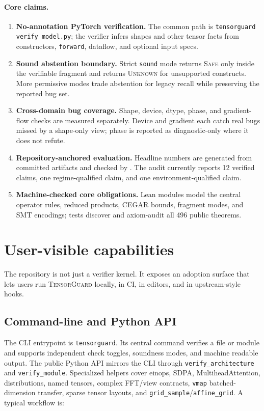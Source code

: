 \documentclass[11pt]{article}
\newcommand{\tg}{\textsc{TensorGuard}}
\newcommand{\safe}{\textsc{Safe}}
\newcommand{\unknown}{\textsc{Unknown}}
\begin{document}
\paragraph{Core claims.}
\begin{enumerate}[leftmargin=2em]
  \item \textbf{No-annotation PyTorch verification.}  The common path is
  \texttt{tensorguard verify model.py}; the verifier infers shapes and other
  tensor facts from constructors, \texttt{forward}, dataflow, and optional input
  specs.
  \item \textbf{Sound abstention boundary.}  Strict \texttt{sound} mode returns
  \safe{} only inside the verifiable fragment and returns \unknown{} for
  unsupported constructs.  More permissive modes trade abstention for legacy
  recall while preserving the reported bug set.
  \item \textbf{Cross-domain bug coverage.}  Shape, device, dtype, phase, and
  gradient-flow checks are measured separately.  Device and gradient each catch
  real bugs missed by a shape-only view; phase is reported as diagnostic-only
  where it does not refute.
  \item \textbf{Repository-anchored evaluation.}  Headline numbers are generated
  from committed artifacts and checked by .
  The audit currently reports 12 verified claims, one regime-qualified claim,
  and one environment-qualified claim.
  \item \textbf{Machine-checked core obligations.}  Lean modules model the
  central operator rules, reduced products, CEGAR bounds, fragment modes, and
  SMT encodings; tests discover and axiom-audit all 496 public theorems.
\end{enumerate}

\section{User-visible capabilities}

The repository is not just a verifier kernel.  It exposes an adoption surface
that lets users run \tg{} locally, in CI, in editors, and in upstream-style
hooks.

\subsection{Command-line and Python API}

The CLI entrypoint is \texttt{tensorguard}.  Its central command verifies a file
or module and supports independent check toggles, soundness modes, and machine
readable output.  The public Python API mirrors the CLI through
\texttt{verify\_architecture} and \texttt{verify\_module}.  Specialized helpers
cover einops, SDPA, MultiheadAttention, distributions, named tensors, complex
FFT/view contracts, \texttt{vmap} batched-dimension transfer, sparse tensor
layouts, and \texttt{grid\_sample}/\texttt{affine\_grid}.  A typical
workflow is:
\end{document}

